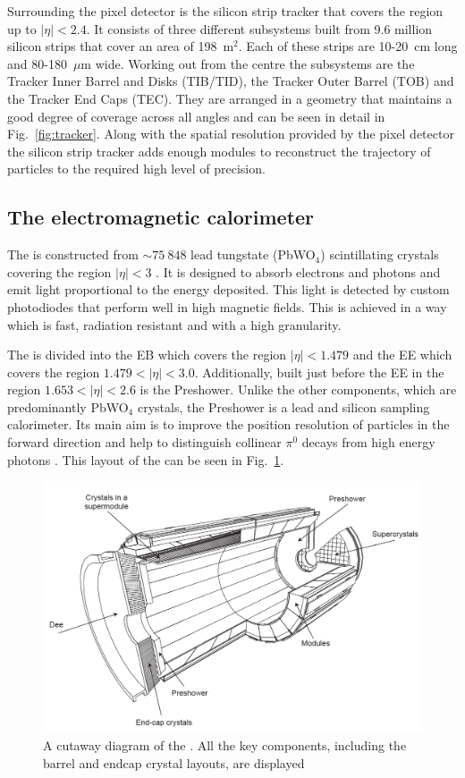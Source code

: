 Surrounding the pixel detector is the silicon strip tracker that
covers the region up to $|\eta|<2.4$. It consists of three different
subsystems built from 9.6 million silicon strips that cover an area of
198~m$^2$. Each of these strips are 10-20~cm long and 80-180~$\mu$m
wide. Working out from the centre the subsystems are the
Tracker Inner Barrel and Disks (TIB/TID), the Tracker Outer Barrel
(TOB) and the Tracker End Caps (TEC). They are arranged in a geometry
that maintains a good degree of coverage across all angles and can be
seen in detail in Fig.~\ref{fig:tracker}. Along with the spatial
resolution provided by the pixel detector the silicon strip tracker
adds enough modules to reconstruct the trajectory of particles to the
required high level of precision.

\subsection{The electromagnetic calorimeter} 

The \ECAL is constructed from $\sim 75~848$ lead tungstate (PbWO$_4$)
scintillating crystals covering the region $|\eta|<3$ \cite{CMS:1997ema}. It is
designed to absorb electrons and photons and emit light proportional to the
energy deposited. This light is detected by custom photodiodes that
perform well in high magnetic fields. This is achieved in a way which
is fast, radiation resistant and with a high granularity. 

The \ECAL is divided into the \ac{EB} which covers the region
$|\eta|<1.479$ and the \ac{EE} which covers the region
$1.479<|\eta|<3.0$. Additionally, built just before the \ac{EE} in the
region $1.653<|\eta|<2.6$ is the Preshower. Unlike the other
components, which are predominantly PbWO$_4$ crystals, the Preshower is
a lead and silicon sampling calorimeter. Its main aim is to improve
the position resolution of particles in the forward direction and help
to distinguish collinear $\pi^0$ decays from high energy photons
\cite{Chatrchyan:2008aa}. This layout of the \ECAL can be seen in
Fig.~\ref{fig:ecal}.

\begin{figure}
\begin{center}
\includegraphics[width=0.8\linewidth]{figs/ecal_colorless} \end{center}
\caption{ A cutaway diagram of the \CMS \ECAL. All the key components,
including the barrel and endcap crystal layouts, are displayed
\cite{Chatrchyan:2008aa}}
\label{fig:ecal} \end{figure}

